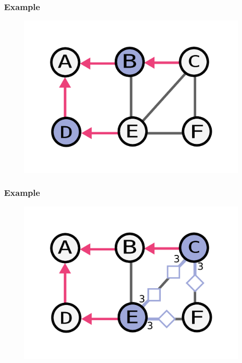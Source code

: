 \documentclass{beamer}
\begin{document}
\begin{frame}
    \frametitle{Example}
    \begin{figure}
    \includegraphics[width=0.5\paperwidth]{round2-end.pdf}
    \end{figure}
\end{frame}


\begin{frame}
    \frametitle{Example}
    \begin{figure}
    \includegraphics[width=0.5\paperwidth]{round3.pdf}
    \end{figure}
\end{frame}
\end{document}
